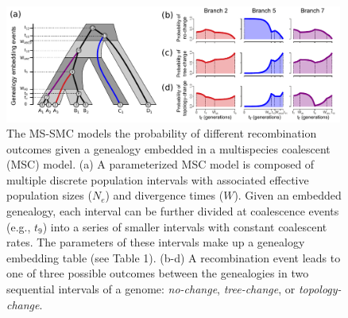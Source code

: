 \documentclass[11pt]{article}
\begin{document}
\begin{figure}
	\centering
	\includegraphics[width=0.99\textwidth]{figures/Fig1-embedding-and-probs-fill.pdf}
	\caption{
		The MS-SMC models the probability of different recombination outcomes 
		given a genealogy embedded in a multispecies coalescent (MSC) model.
		(a) A parameterized MSC model is composed of multiple discrete population
		intervals with associated effective population sizes ($N_e$) and divergence 
		times ($W$). Given an embedded genealogy, each interval can be further divided 
		at coalescence events (e.g., $t_9$) into a series of smaller intervals
		with constant coalescent rates. The parameters of these intervals make up a 
		genealogy embedding table (see Table 1).
		(b-d) A recombination event leads to one of three possible outcomes 
		between the genealogies in two sequential intervals of a genome: 
		\emph{no-change}, \emph{tree-change}, or \emph{topology-change}. 		
}
\end{figure}
\end{document}
